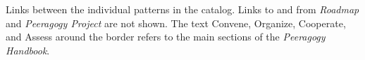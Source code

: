 Links between the individual patterns in the catalog.  Links to and from \emph{Roadmap} and \emph{Peeragogy Project} are not shown.  The text Convene, Organize, Cooperate, and Assess around the border refers to the main sections of the \emph{Peeragogy Handbook}.